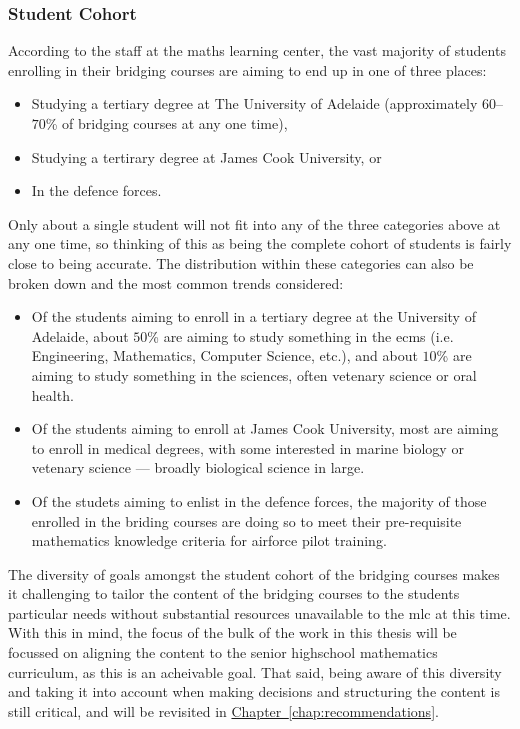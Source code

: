 \documentclass[twoside,12pt,a4paper]{report}
\newcommand{\refchap}[1]{\hyperref[chap:#1]{Chapter~\ref{chap:#1}}}
\begin{document}
\subsubsection{Student Cohort}

According to the staff at the maths learning center, the vast majority of students enrolling in their bridging courses are aiming to end up in one of three places:
\begin{itemize}
	\item Studying a tertiary degree at The University of Adelaide (approximately $60$--$70$\% of bridging courses at any one time),
	\item Studying a tertirary degree at James Cook University, or
	\item In the defence forces.
\end{itemize}
Only about a single student will not fit into any of the three categories above at any one time, so thinking of this as being the complete cohort of students is fairly close to being accurate. The distribution within these categories can also be broken down and the most common trends considered:
\begin{itemize}
	\item Of the students aiming to enroll in a tertiary degree at the University of Adelaide, about $50$\% are aiming to study something in the \gls{ecms} (i.e. Engineering, Mathematics, Computer Science, etc.), and about $10$\% are aiming to study something in the sciences, often vetenary science or oral health.
	\item Of the students aiming to enroll at James Cook University, most are aiming to enroll in medical degrees, with some interested in marine biology or vetenary science --- broadly biological science in large.
	\item Of the studets aiming to enlist in the defence forces, the majority of those enrolled in the briding courses are doing so to meet their pre-requisite mathematics knowledge criteria for airforce pilot training.
\end{itemize}

The diversity of goals amongst the student cohort of the bridging courses makes it challenging to tailor the content of the bridging courses to the students particular needs without substantial resources unavailable to the \gls{mlc} at this time. With this in mind, the focus of the bulk of the work in this thesis will be focussed on aligning the content to the senior highschool mathematics curriculum, as this is an acheivable goal. That said, being aware of this diversity and taking it into account when making decisions and structuring the content is still critical, and will be revisited in \refchap{recommendations}.
\end{document}
